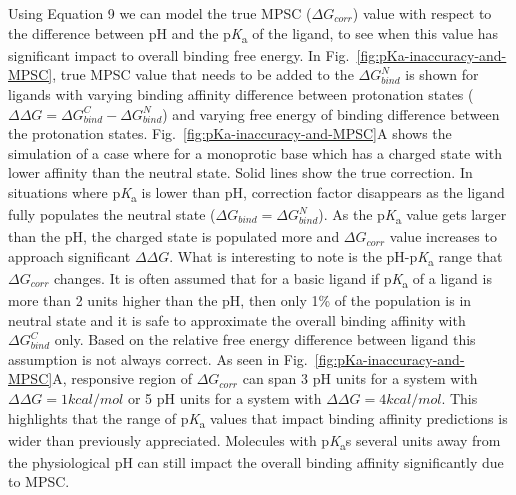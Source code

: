 \documentclass[9pt,lineno,final]{elife}
\newcommand{\pKa}{p\textit{K}\textsubscript{a}}
\begin{document}
Using Equation 9 we can model the true MPSC ($\Delta G_{corr}$) value with respect to the difference between pH and the \pKa{} of the ligand, to see when this value has significant impact to overall binding free energy. In Fig.~\ref{fig:pKa-inaccuracy-and-MPSC}, true MPSC value that needs to be added to the $\Delta G_{bind}^{N}$ is shown for ligands with varying binding affinity difference between protonation states ($\Delta\Delta G = \Delta G_{bind}^{C} - \Delta G_{bind}^{N}$) and varying free energy of binding difference between the protonation states. Fig.~\ref{fig:pKa-inaccuracy-and-MPSC}A shows the simulation of a case where for a monoprotic base which has a charged state with lower affinity than the neutral state. Solid lines show the true correction. In situations where \pKa{} is lower than pH, correction factor disappears as the ligand fully populates the neutral state ($\Delta G_{bind} = \Delta G_{bind}^{N}$). As the \pKa{} value gets larger than the pH, the charged state is populated more and $\Delta G_{corr}$ value increases to approach  significant $\Delta\Delta G$. 
What is interesting to note is the pH-\pKa{} range that $\Delta G_{corr}$ changes.
It is often assumed that for a basic ligand if \pKa{} of a ligand is more than 2 units higher than the pH, then only 1\% of the population is in neutral state and it is safe to approximate the overall binding affinity with $\Delta G_{bind}^{C}$ only. Based on the relative free energy difference between ligand this assumption is not always correct. As seen in Fig.~\ref{fig:pKa-inaccuracy-and-MPSC}A, responsive region of $\Delta G_{corr}$ can span 3 pH units for a system with $\Delta\Delta G = 1 kcal/mol$  or 5 pH units for a system with $\Delta\Delta G = 4 kcal/mol$. This highlights that the range of \pKa{} values that impact binding affinity predictions is wider than previously appreciated. Molecules with \pKa{}s several units away from the physiological pH can still impact the overall binding affinity significantly due to MPSC. 
\end{document}
